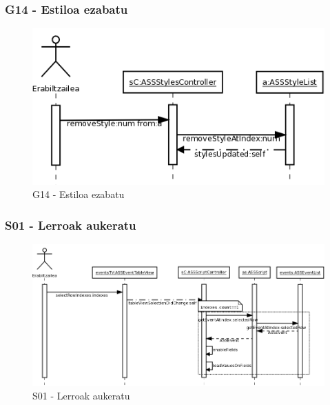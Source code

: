 \newpage
\subsubsection{G14 - Estiloa ezabatu}
\begin{figure}[htp]
\begin{center}
\includegraphics[scale=0.35]{Pictures/Chapter4/Diseinua/G14.png}
\caption{G14 - Estiloa ezabatu}
\label{g14d}
\end{center}
\end{figure}


\subsubsection{S01 - Lerroak aukeratu}
\begin{figure}[htp]
\begin{center}
\includegraphics[scale=0.3]{Pictures/Chapter4/Diseinua/S01.png}
\caption{S01 - Lerroak aukeratu}
\label{s01d}
\end{center}
\end{figure}

\newpage
